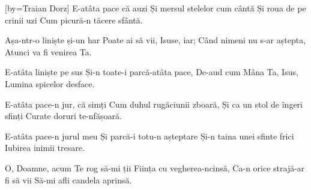 [by={Traian Dorz}]
\beginverse
E-atâta pace că auzi
Și mersul stelelor cum cântă
Și roua de pe crinii uzi
Cum picură-n tăcere sfântă.
\endverse

\beginchorus
Așa-ntr-o liniște și-un har
Poate ai să vii, Isuse, iar;
Când nimeni nu s-ar aștepta,
Atunci va fi venirea Ta.
\endchorus

\beginverse
E-atâta liniște pe sus
Și-n toate-i parcă-atâta pace,
De-aud cum Mâna Ta, Isus,
Lumina spicelor desface.
\endverse

\beginverse
E-atâta pace-n jur, că simți
Cum duhul rugăciunii zboară,
Și ca un stol de îngeri sfinți
Curate doruri te-nfășoară.
\endverse

\beginverse
E-atâta pace-n jurul meu
Și parcă-i totu-n așteptare
Și-n taina unei sfinte frici
Iubirea inimii tresare.
\endverse

\beginverse
O, Doamne, acum Te rog să-mi ții
Ființa cu vegherea-ncinsă,
Ca-n orice strajă-ar fi să vii
Să-mi afli candela aprinsă.
\endverse
\endsong